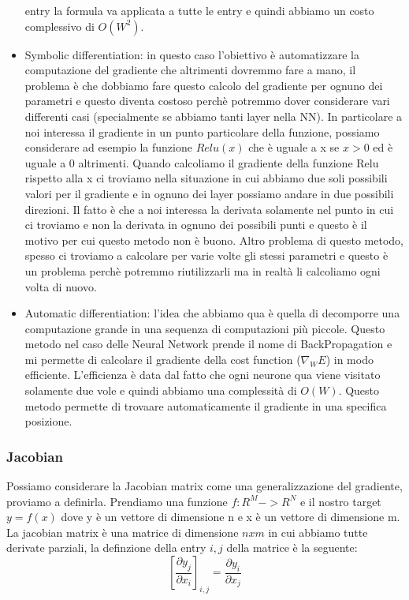 \documentclass[14pt]{extreport}
\begin{document}
\begin{itemize}
entry la formula va applicata a tutte le entry e quindi abbiamo un costo complessivo di $O(W^2)$.
\item Symbolic differentiation: in questo caso l'obiettivo è automatizzare la computazione del gradiente che altrimenti dovremmo fare a mano, il
problema è che dobbiamo fare questo calcolo del gradiente per ognuno dei parametri e questo diventa costoso perchè potremmo dover considerare vari
differenti casi (specialmente se abbiamo tanti layer nella NN). In particolare a noi interessa il gradiente in un punto particolare della funzione,
possiamo considerare ad esempio la funzione $Relu(x)$ che è uguale a x se $x>0$ ed è uguale a 0 altrimenti. Quando calcoliamo il gradiente della
funzione Relu rispetto alla x ci troviamo nella situazione in cui abbiamo due soli possibili valori per il gradiente e in ognuno dei layer possiamo
andare in due possibili direzioni. Il fatto è che a noi interessa la derivata solamente nel punto in cui ci troviamo e non la derivata in ognuno dei
possibili punti e questo è il motivo per cui questo metodo non è buono. Altro problema di questo metodo, spesso ci troviamo a calcolare per varie
volte gli stessi parametri e questo è un problema perchè potremmo riutilizzarli ma in realtà li calcoliamo ogni volta di nuovo.
\item Automatic differentiation: l'idea che abbiamo qua è quella di decomporre una computazione grande in una sequenza di computazioni più piccole.
Questo metodo nel caso delle Neural Network prende il nome di BackPropagation e mi permette di calcolare il gradiente della cost function ($\nabla_W
E$) in modo efficiente. L'efficienza è data dal fatto che ogni neurone qua viene visitato solamente due vole e quindi abbiamo una complessità di
$O(W)$. Questo metodo permette di trovaare automaticamente il gradiente in una specifica posizione.
\end{itemize}

\subsubsection{Jacobian}

Possiamo considerare la Jacobian matrix come una generalizzazione del gradiente, proviamo a definirla. Prendiamo una funzione $f: R^M -> R^N$ e il
nostro target $y = f(x)$ dove y è un vettore di dimensione n e x è un vettore di dimensione m. La jacobian matrix è una matrice di dimensione $nxm$ in
cui abbiamo tutte derivate parziali, la definzione della entry $i,j$ della matrice è la seguente:
$$[\frac{\partial y_j}{\partial x_i}]_{i,j} = \frac{\partial y_i}{\partial x_j}$$
\end{document}

